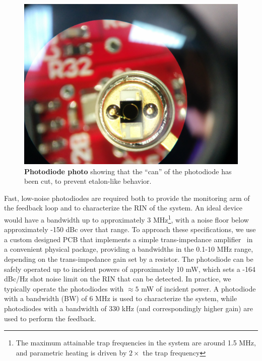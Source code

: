 \documentclass[twocolumn,aps,pra,showpacs,preprintnumbers,bibnotes]{revtex4-1}
\begin{document}
\begin{figure}
  \begin{center}
    \includegraphics[scale=0.1]{fig/cut_photodiode.jpg}
    \caption{\textbf{Photodiode photo} showing that the ``can'' of the photodiode has been cut, to prevent etalon-like behavior.}\label{fig:cut_pd}
  \end{center}
\end{figure}

Fast, low-noise photodiodes are required both to provide the monitoring arm of the feedback loop and to characterize the RIN of the system.
An ideal device would have a bandwidth up to approximately 3 MHz\footnote{The maximum attainable trap frequencies in the system are around 1.5 MHz, and parametric heating is driven by $2\times$ the trap frequency}, with a noise floor below approximately -150 dBc over that range.
To approach these specifications, we use a custom designed PCB that implements a simple trans-impedance amplifier~\cite{Graeme1995} in a convenient physical package, providing a bandwidths in the 0.1-10 MHz range, depending on the trans-impedance gain set by a resistor. 
The photodiode can be safely operated up to incident powers of approximately 10 mW, which sets a -164 dBc/Hz shot noise limit on the RIN that can be detected. 
In practice, we typically operate the photodiodes with $\approx 5$ mW of incident power.
A photodiode with a bandwidth (BW) of 6 MHz is used to characterize the system, while photodiodes with a bandwidth of 330 kHz (and correspondingly higher gain) are used to perform the feedback.
\end{document}
